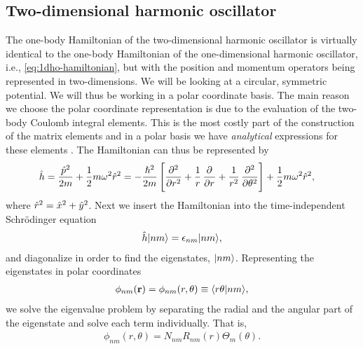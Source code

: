     \subsection{Two-dimensional harmonic oscillator}
        The one-body Hamiltonian of the two-dimensional harmonic oscillator is
        virtually identical to the one-body Hamiltonian of the one-dimensional
        harmonic oscillator, i.e., \autoref{eq:1dho-hamiltonian}, but with the
        position and momentum operators being represented in two-dimensions. We
        will be looking at a circular, symmetric potential. We will thus be
        working in a polar coordinate basis. The main reason we choose
        the polar coordinate representation is due to the evaluation of the
        two-body Coulomb integral elements. This is the most costly part of the
        construction of the matrix elements and in a polar basis we have
        \emph{analytical} expressions for these elements
        \cite{anisimovas1998energy}.  The Hamiltonian can thus be represented by
        \begin{align}
            \onehamil &=
            \frac{\momentum^2}{2m}
            + \half m\omega^2\position[r]^2
            = -\frac{\hslash^2}{2m}\brak{
                \dpd[2]{}{r}
                + \frac{1}{r}\dpd[]{}{r}
                + \frac{1}{r^2}\dpd[2]{}{\theta}
            }
            + \half m \omega^2 \position[r]^2,
        \end{align}
        where $\position[r]^2 = \position^2 + \position[y]^2$. Next we insert
        the Hamiltonian into the time-independent Schrödinger equation
        \begin{align}
            \onehamil\ket{nm} = \epsilon_{nm}\ket{nm},
        \end{align}
        and diagonalize in order to find the eigenstates, $\ket{nm}$.
        Representing the eigenstates in polar coordinates
        \begin{align}
            \phi_{nm}(\vf{r}) = \phi_{nm}(r, \theta)
            \equiv \braket{r\theta}{nm},
        \end{align}
        we solve the eigenvalue problem by separating the radial and the angular
        part of the eigenstate and solve each term individually. That is,
        \begin{align}
            \phi_{nm}(r, \theta) = N_{nm}R_{nm}(r)\Theta_{m}(\theta).
            \label{eq:spf-2dqd}
        \end{align}
